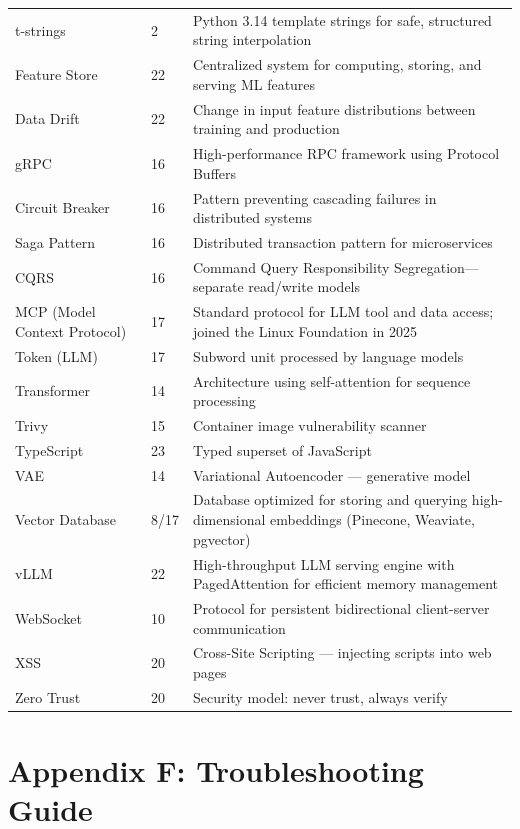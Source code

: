 \documentclass[11pt, a4paper, oneside]{report}
\begin{document}
{{{{{{{{{\begin{longtable}{L{0.22\textwidth} L{0.08\textwidth} L{0.60\textwidth}}
t-strings & 2 & Python 3.14 template strings for safe, structured string interpolation \\
Feature Store & 22 & Centralized system for computing, storing, and serving ML features \\
Data Drift & 22 & Change in input feature distributions between training and production \\
gRPC & 16 & High-performance RPC framework using Protocol Buffers \\
Circuit Breaker & 16 & Pattern preventing cascading failures in distributed systems \\
Saga Pattern & 16 & Distributed transaction pattern for microservices \\
CQRS & 16 & Command Query Responsibility Segregation---separate read/write models \\
MCP (Model Context Protocol) & 17 & Standard protocol for LLM tool and data access; joined the Linux Foundation in 2025 \\
Token (LLM) & 17 & Subword unit processed by language models \\
Transformer & 14 & Architecture using self-attention for sequence processing \\
Trivy & 15 & Container image vulnerability scanner \\
TypeScript & 23 & Typed superset of JavaScript \\
VAE & 14 & Variational Autoencoder --- generative model \\
Vector Database & 8/17 & Database optimized for storing and querying high-dimensional embeddings (Pinecone, Weaviate, pgvector) \\
vLLM & 22 & High-throughput LLM serving engine with PagedAttention for efficient memory management \\
WebSocket & 10 & Protocol for persistent bidirectional client-server communication \\
XSS & 20 & Cross-Site Scripting --- injecting scripts into web pages \\
Zero Trust & 20 & Security model: never trust, always verify \\
\end{longtable}

\clearpage
\chapter[Troubleshooting Guide]{Appendix F: Troubleshooting Guide}

}}}}}}}}}
\end{document}
